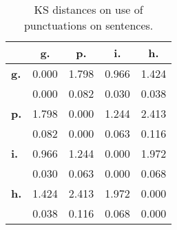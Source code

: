 \begin{table}[h!]
\begin{center}
\begin{tabular}{| l || c | c | c | c |}\hline
 & {\bf g.} & {\bf p.} & {\bf i.} & {\bf h.} \\\hline\hline
{\bf g.} & 0.000 & 1.798 & 0.966 & 1.424 \\
{\bf } & 0.000 & 0.082 & 0.030 & 0.038 \\\hline
{\bf p.} & 1.798 & 0.000 & 1.244 & 2.413 \\
{\bf } & 0.082 & 0.000 & 0.063 & 0.116 \\\hline
{\bf i.} & 0.966 & 1.244 & 0.000 & 1.972 \\
{\bf } & 0.030 & 0.063 & 0.000 & 0.068 \\\hline
{\bf h.} & 1.424 & 2.413 & 1.972 & 0.000 \\
{\bf } & 0.038 & 0.116 & 0.068 & 0.000 \\\hline
\end{tabular}
\caption{KS distances on use of punctuations on sentences.}
\end{center}
\end{table}